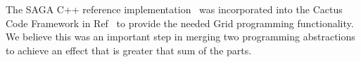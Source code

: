 \documentclass[conference,final]{IEEEtran}
\begin{document}
The SAGA C++ reference implementation~\cite{saga_web} was incorporated
into the Cactus Code Framework in Ref~\cite{escience07} to provide the
needed Grid programming functionality.  We believe this was an
important step in merging two programming abstractions to achieve an
effect that is greater that sum of the parts. 



\end{document}
